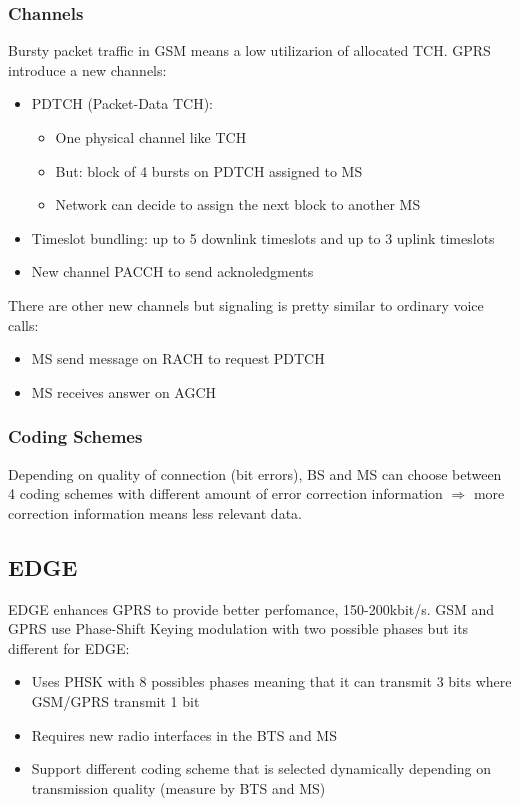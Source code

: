 \subsubsection{Channels}
Bursty packet traffic in GSM means a low utilizarion of allocated TCH.
GPRS introduce a new channels: 
\begin{itemize}
	\item PDTCH (Packet-Data TCH):
	\begin{itemize}
		\item One physical channel like TCH
		\item But: block of 4 bursts on PDTCH assigned to MS
		\item Network can decide to assign the next block to 
			another MS
	\end{itemize}
	\item Timeslot bundling: up to 5 downlink timeslots and up
	to 3 uplink timeslots
	\item New channel PACCH to send acknoledgments
\end{itemize}
There are other new channels but signaling is pretty similar to ordinary voice
calls:
\begin{itemize}
	\item MS send message on RACH to request PDTCH
	\item MS receives answer on AGCH
\end{itemize}

\subsubsection{Coding Schemes}
Depending on quality of connection (bit errors), BS and 
MS can choose between 4 coding schemes with different amount 
of error correction information $\Rightarrow$ more correction 
information means less relevant data.

\subsection{EDGE}
EDGE enhances GPRS to provide better perfomance, 150-200kbit/s. GSM and
GPRS use Phase-Shift Keying modulation with two possible phases but its 
different for EDGE:
\begin{itemize}
	\item Uses PHSK with 8 possibles phases meaning that it can transmit
	3 bits where GSM/GPRS transmit 1 bit
	
	\item Requires new radio interfaces in the BTS and MS
	\item Support different coding scheme that is selected dynamically depending
	on transmission quality (measure by BTS and MS)

\end{itemize}

